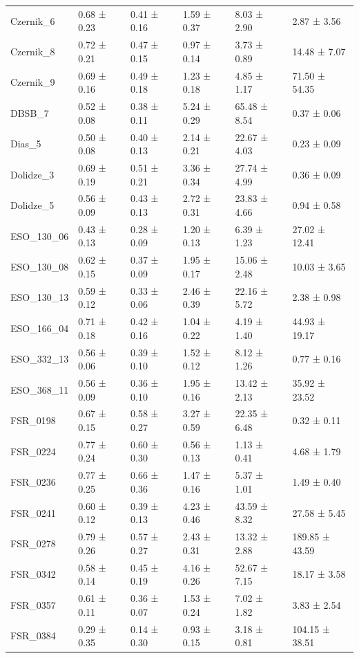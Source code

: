 \begin{tabular}{llllll}
Czernik_6 & 0.68 ± 0.23 & 0.41 ± 0.16 & 1.59 ± 0.37 & 8.03 ± 2.90 & 2.87 ± 3.56 \\
Czernik_8 & 0.72 ± 0.21 & 0.47 ± 0.15 & 0.97 ± 0.14 & 3.73 ± 0.89 & 14.48 ± 7.07 \\
Czernik_9 & 0.69 ± 0.16 & 0.49 ± 0.18 & 1.23 ± 0.18 & 4.85 ± 1.17 & 71.50 ± 54.35 \\
DBSB_7 & 0.52 ± 0.08 & 0.38 ± 0.11 & 5.24 ± 0.29 & 65.48 ± 8.54 & 0.37 ± 0.06 \\
Dias_5 & 0.50 ± 0.08 & 0.40 ± 0.13 & 2.14 ± 0.21 & 22.67 ± 4.03 & 0.23 ± 0.09 \\
Dolidze_3 & 0.69 ± 0.19 & 0.51 ± 0.21 & 3.36 ± 0.34 & 27.74 ± 4.99 & 0.36 ± 0.09 \\
Dolidze_5 & 0.56 ± 0.09 & 0.43 ± 0.13 & 2.72 ± 0.31 & 23.83 ± 4.66 & 0.94 ± 0.58 \\
ESO_130_06 & 0.43 ± 0.13 & 0.28 ± 0.09 & 1.20 ± 0.13 & 6.39 ± 1.23 & 27.02 ± 12.41 \\
ESO_130_08 & 0.62 ± 0.15 & 0.37 ± 0.09 & 1.95 ± 0.17 & 15.06 ± 2.48 & 10.03 ± 3.65 \\
ESO_130_13 & 0.59 ± 0.12 & 0.33 ± 0.06 & 2.46 ± 0.39 & 22.16 ± 5.72 & 2.38 ± 0.98 \\
ESO_166_04 & 0.71 ± 0.18 & 0.42 ± 0.16 & 1.04 ± 0.22 & 4.19 ± 1.40 & 44.93 ± 19.17 \\
ESO_332_13 & 0.56 ± 0.06 & 0.39 ± 0.10 & 1.52 ± 0.12 & 8.12 ± 1.26 & 0.77 ± 0.16 \\
ESO_368_11 & 0.56 ± 0.09 & 0.36 ± 0.10 & 1.95 ± 0.16 & 13.42 ± 2.13 & 35.92 ± 23.52 \\
FSR_0198 & 0.67 ± 0.15 & 0.58 ± 0.27 & 3.27 ± 0.59 & 22.35 ± 6.48 & 0.32 ± 0.11 \\
FSR_0224 & 0.77 ± 0.24 & 0.60 ± 0.30 & 0.56 ± 0.13 & 1.13 ± 0.41 & 4.68 ± 1.79 \\
FSR_0236 & 0.77 ± 0.25 & 0.66 ± 0.36 & 1.47 ± 0.16 & 5.37 ± 1.01 & 1.49 ± 0.40 \\
FSR_0241 & 0.60 ± 0.12 & 0.39 ± 0.13 & 4.23 ± 0.46 & 43.59 ± 8.32 & 27.58 ± 5.45 \\
FSR_0278 & 0.79 ± 0.26 & 0.57 ± 0.27 & 2.43 ± 0.31 & 13.32 ± 2.88 & 189.85 ± 43.59 \\
FSR_0342 & 0.58 ± 0.14 & 0.45 ± 0.19 & 4.16 ± 0.26 & 52.67 ± 7.15 & 18.17 ± 3.58 \\
FSR_0357 & 0.61 ± 0.11 & 0.36 ± 0.07 & 1.53 ± 0.24 & 7.02 ± 1.82 & 3.83 ± 2.54 \\
FSR_0384 & 0.29 ± 0.35 & 0.14 ± 0.30 & 0.93 ± 0.15 & 3.18 ± 0.81 & 104.15 ± 38.51 \\

\end{tabular}
